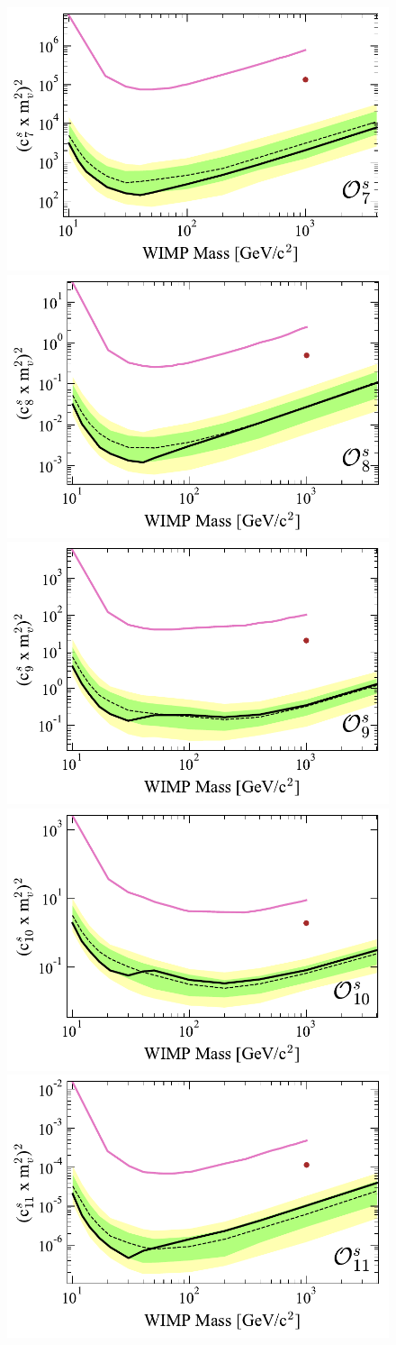 \documentclass[reprint, showpacs,
preprintnumbers,
amsmath,amssymb,
aps, floatfix,
superscriptaddress,
prd, nofootinbib]{revtex4-1}
\begin{document}
\begin{figure}
    \includegraphics[width=0.5\columnwidth]{SR1_EFT_O7s_c2_lim_Comparison}
    \includegraphics[width=0.5\columnwidth]{SR1_EFT_O8s_c2_lim_Comparison}
    \includegraphics[width=0.5\columnwidth]{SR1_EFT_O9s_c2_lim_Comparison}
    \includegraphics[width=0.5\columnwidth]{SR1_EFT_O10s_c2_lim_Comparison}
    \includegraphics[width=0.5\columnwidth]{SR1_EFT_O11s_c2_lim_Comparison}

\end{figure}
\end{document}
